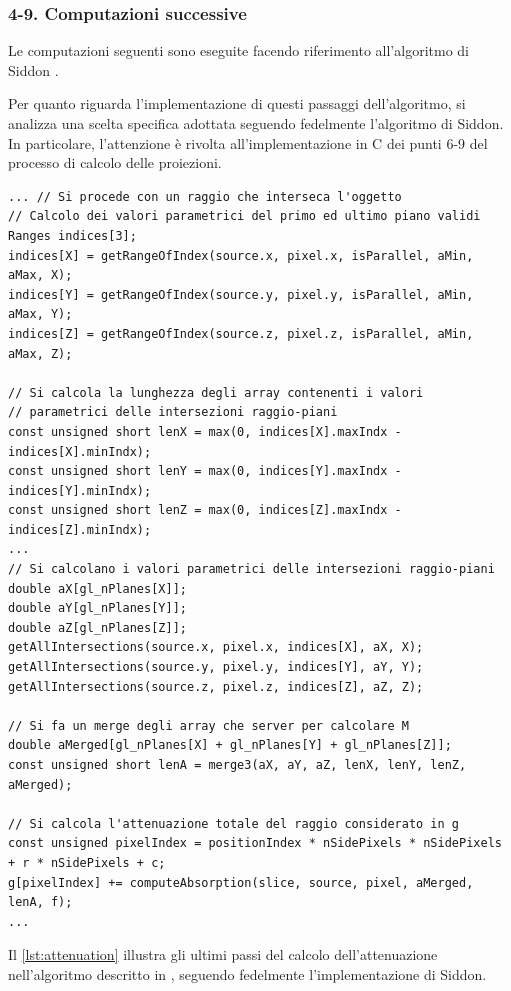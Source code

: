 \documentclass[12pt,a4paper]{report}
\begin{document}
\subsubsection{4-9. Computazioni successive}

Le computazioni seguenti sono eseguite facendo riferimento all'algoritmo di Siddon \cite{Siddon1984}.

Per quanto riguarda l'implementazione di questi passaggi dell'algoritmo, si analizza una scelta specifica adottata seguendo
fedelmente l'algoritmo di Siddon.
In particolare, l'attenzione è rivolta all'implementazione in C dei punti 6-9 del processo di calcolo delle proiezioni.

\begin{lstlisting}[language=CStyle, caption={Codice C per il calcolo dell'attenuazione.}, label={lst:attenuation}]
... // Si procede con un raggio che interseca l'oggetto
// Calcolo dei valori parametrici del primo ed ultimo piano validi
Ranges indices[3];
indices[X] = getRangeOfIndex(source.x, pixel.x, isParallel, aMin, aMax, X);
indices[Y] = getRangeOfIndex(source.y, pixel.y, isParallel, aMin, aMax, Y);
indices[Z] = getRangeOfIndex(source.z, pixel.z, isParallel, aMin, aMax, Z);

// Si calcola la lunghezza degli array contenenti i valori
// parametrici delle intersezioni raggio-piani
const unsigned short lenX = max(0, indices[X].maxIndx - indices[X].minIndx);
const unsigned short lenY = max(0, indices[Y].maxIndx - indices[Y].minIndx);
const unsigned short lenZ = max(0, indices[Z].maxIndx - indices[Z].minIndx);
...
// Si calcolano i valori parametrici delle intersezioni raggio-piani
double aX[gl_nPlanes[X]];
double aY[gl_nPlanes[Y]];
double aZ[gl_nPlanes[Z]];
getAllIntersections(source.x, pixel.x, indices[X], aX, X);
getAllIntersections(source.y, pixel.y, indices[Y], aY, Y);
getAllIntersections(source.z, pixel.z, indices[Z], aZ, Z);

// Si fa un merge degli array che server per calcolare M
double aMerged[gl_nPlanes[X] + gl_nPlanes[Y] + gl_nPlanes[Z]];
const unsigned short lenA = merge3(aX, aY, aZ, lenX, lenY, lenZ, aMerged);

// Si calcola l'attenuazione totale del raggio considerato in g
const unsigned pixelIndex = positionIndex * nSidePixels * nSidePixels + r * nSidePixels + c;
g[pixelIndex] += computeAbsorption(slice, source, pixel, aMerged, lenA, f);
...
\end{lstlisting}

Il \autoref{lst:attenuation} illustra gli ultimi passi del calcolo dell'attenuazione nell'algoritmo descritto in
\cite{Colletta2024}, seguendo fedelmente l'implementazione di Siddon.
\end{document}
